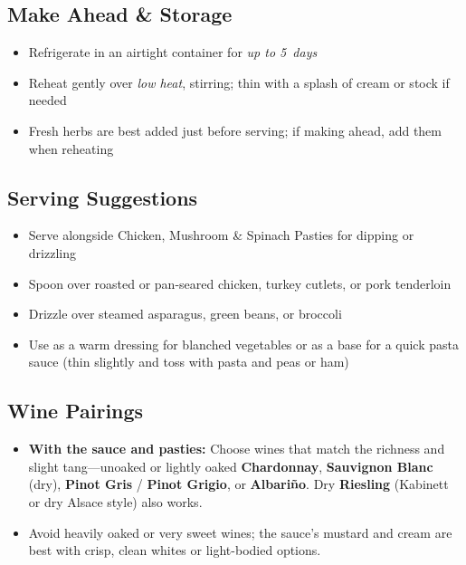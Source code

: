 \documentclass[11pt,letterpaper]{article}
\begin{document}
\subsection*{Make Ahead \& Storage}
\begin{itemize}
    \item Refrigerate in an airtight container for \textit{up to 5~days}
    \item Reheat gently over \textit{low heat}, stirring; thin with a splash of cream or stock if needed
    \item Fresh herbs are best added just before serving; if making ahead, add them when reheating
\end{itemize}

\subsection*{Serving Suggestions}
\begin{itemize}
    \item Serve alongside Chicken, Mushroom \& Spinach Pasties for dipping or drizzling
    \item Spoon over roasted or pan-seared chicken, turkey cutlets, or pork tenderloin
    \item Drizzle over steamed asparagus, green beans, or broccoli
    \item Use as a warm dressing for blanched vegetables or as a base for a quick pasta sauce (thin slightly and toss with pasta and peas or ham)
\end{itemize}

\subsection*{Wine Pairings}
\begin{itemize}
    \item \textbf{With the sauce and pasties:} Choose wines that match the richness and slight tang---unoaked or lightly oaked \textbf{Chardonnay}, \textbf{Sauvignon Blanc} (dry), \textbf{Pinot Gris} / \textbf{Pinot Grigio}, or \textbf{Albariño}. Dry \textbf{Riesling} (Kabinett or dry Alsace style) also works.
    \item Avoid heavily oaked or very sweet wines; the sauce's mustard and cream are best with crisp, clean whites or light-bodied options.
\end{itemize}
\end{document}
